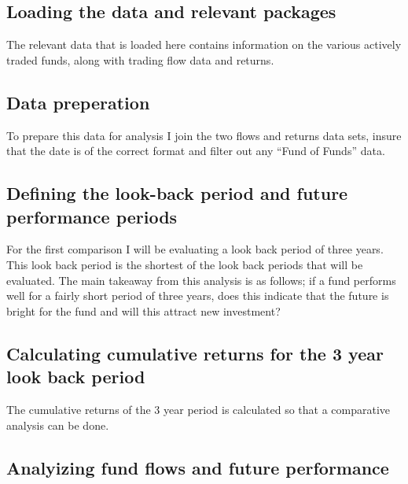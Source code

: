 \documentclass[11pt,preprint, authoryear]{elsarticle}
\numberwithin{equation}{section}
\numberwithin{figure}{section}
\numberwithin{table}{section}
\begin{document}
\hypertarget{loading-the-data-and-relevant-packages}{%
\subsection{Loading the data and relevant
packages}\label{loading-the-data-and-relevant-packages}}

The relevant data that is loaded here contains information on the
various actively traded funds, along with trading flow data and returns.

\hypertarget{data-preperation}{%
\subsection{Data preperation}\label{data-preperation}}

To prepare this data for analysis I join the two flows and returns data
sets, insure that the date is of the correct format and filter out any
``Fund of Funds'' data.

\hypertarget{defining-the-look-back-period-and-future-performance-periods}{%
\subsection{Defining the look-back period and future performance
periods}\label{defining-the-look-back-period-and-future-performance-periods}}

For the first comparison I will be evaluating a look back period of
three years. This look back period is the shortest of the look back
periods that will be evaluated. The main takeaway from this analysis is
as follows; if a fund performs well for a fairly short period of three
years, does this indicate that the future is bright for the fund and
will this attract new investment?

\hypertarget{calculating-cumulative-returns-for-the-3-year-look-back-period}{%
\subsection{Calculating cumulative returns for the 3 year look back
period}\label{calculating-cumulative-returns-for-the-3-year-look-back-period}}

The cumulative returns of the 3 year period is calculated so that a
comparative analysis can be done.

\hypertarget{analyizing-fund-flows-and-future-performance}{%
\subsection{Analyizing fund flows and future
performance}\label{analyizing-fund-flows-and-future-performance}}
\end{document}
